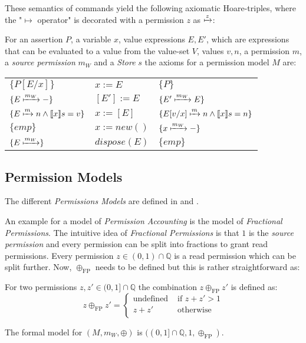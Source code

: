 	These semantics of commands yield the following axiomatic Hoare-triples,
	where the "$\mapsto$ operator" is decorated with a permission $z$ as
	$\xmapsto{z}$:
	\begin{mydef}
	For an assertion $P$, a variable $x$, value expressions $E, E'$, which are
	expressions that can be evaluated to a value from the value-set $V$, values
	$v, n$, a permission $m$, a \emph{source permission} $m_W$ and a
	\emph{Store} $s$ the axioms for a permission model $M$ are:\\
	\begin{center}
	\begin{tabular}{p{4cm}p{3cm}p{5cm}}
		$\{P[E/x]\}$ & $x:=E$ & $\{P\}$ \\
		$\{E\xmapsto{m_W}-\}$ & $[E'] := E$ & $\{E'\xmapsto{m_W}E\}$ \\
		$\{E\xmapsto{m} n \land \llbracket x\rrbracket s =v\}$ & $x:=[E]$ & $\{E[v/x]\xmapsto{m}n\land\llbracket x\rrbracket s = n\}$\\
		$\{\textit{emp}\}$ & $x:=\textit{new}()$ & $\{x \xmapsto{m_W} -\}$\\
		$\{E\xmapsto{m_W}\}$ & $\textit{dispose}(E)$ & $\{\textit{emp}\}$\\
	\end{tabular}
	\end{center}
	\end{mydef}

	\subsection{Permission Models}
	The different \emph{Permissions Models} are defined in \cite{freshlook} and
	\cite{PermAcc}.

	An example for a model of \emph{Permission Accounting} is the model of
	\emph{Fractional Permissions}. The intuitive idea of \emph{Fractional Permissions}
	is that $1$ is the \emph{source permission} and every permission can be split
	into fractions to grant read permissions. Every permission
	$z \in (0,1)\cap\mathbb{Q}$ is a read permission which can be split further.
	Now, $\oplus_\text{FP}$ needs to be defined but this is rather
	straightforward as:
	\begin{mydef}
		For two permissions $z,z' \in (0,1]\cap\mathbb{Q}$ the combination
		$z \oplus_\text{FP} z'$ is defined as:
		$$z \oplus_\text{FP} z' =
			\begin{cases}
				\text{undefined} & \text{ if $z + z' > 1$} \\
				z + z' & \text{ otherwise} \\
			\end{cases}
		$$
	\end{mydef}
	The formal model for $(M, m_W, \oplus)$ is
	$((0,1]\cap\mathbb{Q},1,\oplus_\text{FP})$.

